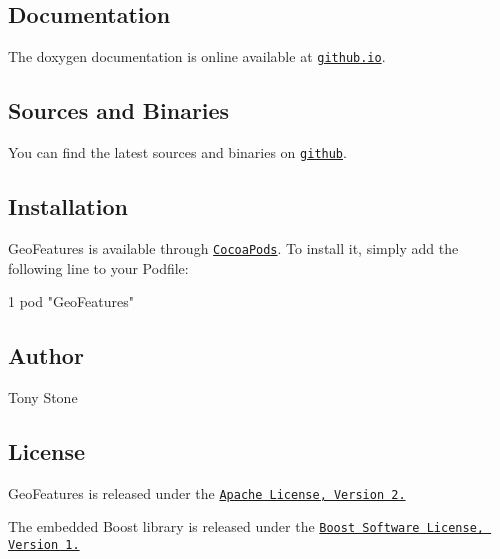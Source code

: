 \subsection*{Documentation}

The doxygen documentation is online available at \href{http://tonystone.github.io/geofeatures}{\tt github.\+io}.

\subsection*{Sources and Binaries}

You can find the latest sources and binaries on \href{https://github.com/tonystone/geofeatures}{\tt github}.

\subsection*{Installation}

Geo\+Features is available through \href{http://cocoapods.org}{\tt Cocoa\+Pods}. To install it, simply add the following line to your Podfile\+:


\begin{DoxyCode}
1 pod "GeoFeatures"
\end{DoxyCode}
 \subsection*{Author}

Tony Stone

\subsection*{License}

Geo\+Features is released under the \href{http://www.apache.org/licenses/LICENSE-2.0.html}{\tt Apache License, Version 2.}

The embedded Boost library is released under the \href{http://www.boost.org/users/license.html}{\tt Boost Software License, Version 1.} 